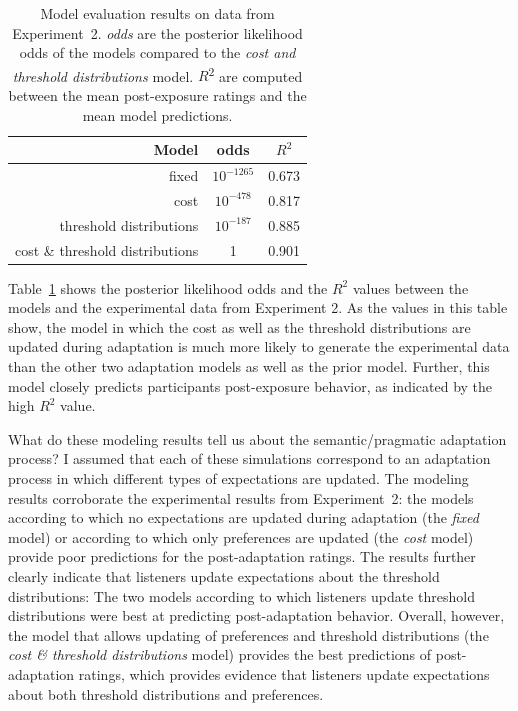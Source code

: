 \begin{table}
\center
\begin{tabular}{r | c | c }
Model &   odds  &  $R^2$ \\ \midrule
fixed & $10^{-1265}$ &  0.673       \\
cost & $10^{-478}$ & 0.817     \\
threshold distributions & $10^{-187}$ &  0.885 \\
cost \& threshold distributions & 1 &  0.901 \\
\end{tabular}
\caption{Model evaluation results on data from Experiment~2.   \textit{odds} are the posterior likelihood odds of the models compared to the \textit{cost and threshold distributions} model.  $R$\textsuperscript{$2$} are computed between  the mean post-exposure ratings and the mean model predictions. \label{tbl:model-comparison-replication}}
\end{table}

Table~\ref{tbl:model-comparison-replication} shows 
the posterior likelihood odds and the $R^2$ values between the models and the experimental data from Experiment 2. 
As the values in this table show, the model in which the cost as well as the threshold 
distributions are updated during adaptation is much more likely to generate the experimental data than the other two adaptation models
as well as the prior model. Further, this model closely predicts participants post-exposure behavior, as indicated by the high $R^2$ value. 
 
 
What do these modeling results tell us about the semantic/pragmatic adaptation process? 
I assumed that each of these simulations
correspond to an adaptation process in which different types of expectations are  updated.
The modeling results corroborate the experimental results from Experiment~2:
the models according to which no expectations are updated during adaptation (the \textit{fixed} model) 
or according to which only preferences are updated (the \textit{cost} model) provide poor predictions for the post-adaptation
ratings. The results further clearly indicate that listeners update expectations about the threshold distributions: The two models according to 
which listeners update threshold distributions were best at predicting post-adaptation behavior. Overall, however, the model that allows updating
of preferences and threshold distributions (the \textit{cost \& threshold distributions} model) provides the best predictions of post-adaptation ratings, which
provides evidence that listeners update expectations about both {threshold distributions} and {preferences}. 


